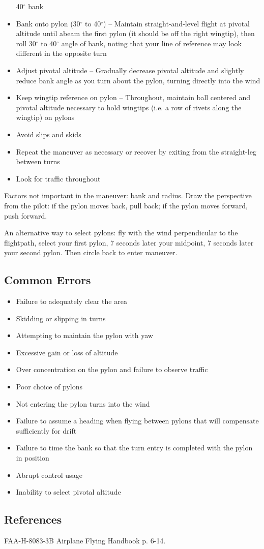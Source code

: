 \begin{itemize}
    40$^\circ$ bank
  \item Bank onto pylon (30$^\circ$ to 40$^\circ$) -- Maintain
    straight-and-level flight at pivotal altitude until abeam the first pylon
    (it should be off the right wingtip), then roll 30$^\circ$ to 40$^\circ$
    angle of bank, noting that your line of reference may look different in the
    opposite turn
  \item Adjust pivotal altitude -- Gradually decrease pivotal altitude and
    slightly reduce bank angle as you turn about the pylon, turning directly
    into the wind
  \item Keep wingtip reference on pylon -- Throughout, maintain ball centered and
    pivotal altitude necessary to hold wingtips (i.e. a row of rivets along the
    wingtip) on pylons
  \item Avoid slips and skids
  \item Repeat the maneuver as necessary or recover by exiting from the
    straight-leg between turns
  \item Look for traffic throughout
\end{itemize}

Factors not important in the maneuver: bank and radius. Draw the perspective
from the pilot: if the pylon moves back, pull back; if the pylon moves forward,
push forward.

An alternative way to select pylons: fly with the wind perpendicular to the
flightpath, select your first pylon, 7 seconds later your midpoint, 7 seconds
later your second pylon. Then circle back to enter maneuver.

\subsection{Common Errors}

\begin{itemize}
  \item Failure to adequately clear the area
  \item Skidding or slipping in turns
  \item Attempting to maintain the pylon with yaw
  \item Excessive gain or loss of altitude
  \item Over concentration on the pylon and failure to observe traffic
  \item Poor choice of pylons
  \item Not entering the pylon turns into the wind
  \item Failure to assume a heading when flying between pylons that will
    compensate sufficiently for drift
  \item Failure to time the bank so that the turn entry is completed with the
    pylon in position
  \item Abrupt control usage
  \item Inability to select pivotal altitude
\end{itemize}

\subsection{References}

FAA-H-8083-3B Airplane Flying Handbook p. 6-14.
